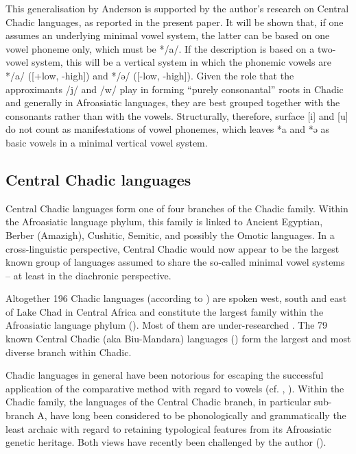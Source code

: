 \documentclass[output=paper]{langscibook}
\begin{document}
This generalisation by Anderson is supported by the author’s research on Central Chadic languages, as reported in the present paper. It will be shown that, if one assumes an underlying minimal vowel system, the latter can be based on one vowel phoneme only, which must be */a/. If the description is based on a two-vowel system, this will be a vertical system in which the phonemic vowels are \mbox{*/a/} ([+low, -high]) and \mbox{*/ə/} ([-low, -high]). Given the role that the approximants \mbox{/j/} and \mbox{/w/} play in forming ``purely consonantal'' roots in Chadic and generally in Afroasiatic languages, they are best grouped together with the consonants rather than with the vowels. Structurally, therefore, surface \mbox{[i]} and \mbox{[u]} do not count as manifestations of vowel phonemes, which leaves \mbox{*a} and \mbox{*ə} as basic vowels in a minimal vertical vowel system.

\subsection{Central Chadic languages}
\label{sec:Wolff:1.3}
Central Chadic languages form one of four branches of the Chadic family. Within the Afroasiatic language phylum, this family is linked to Ancient Egyptian, Berber (Amazigh), Cushitic, Semitic, and possibly the Omotic languages. In a cross\hyp linguistic perspective, Central Chadic would now appear to be the largest known group of languages assumed to share the so-called minimal vowel systems – at least in the diachronic perspective. 

Altogether 196 Chadic languages (according to \citealt{ethnologue24}) are spoken west, south and east of Lake Chad in Central Africa and constitute the largest family within the Afroasiatic language phylum (\citealt{Greenberg1963, Newman1980}). Most of them are under-researched \citep{Newman2006, FrajzyngierShay2012, MeyerWolff2019, WolffPress}. The 79 known Central Chadic (aka Biu-Mandara) languages (\citealt{ethnologue24}) form the largest and most diverse branch within Chadic. 

Chadic languages in general have been notorious for escaping the successful application of the comparative method with regard to vowels (cf. \citealt{Newman1977, JungraithmayrShimizu1981, Stolbova2016}, \citealt{Wolff2017, Wolff2022a}). Within the Chadic family, the languages of the Central Chadic branch, in particular sub-branch A, have long been considered to be phonologically and grammatically the least archaic with regard to retaining typological features from its Afroasiatic genetic heritage. Both views have recently been challenged by the author (\citealt{Wolff2009, Wolff2011, Wolff2017, Wolff2022a, Wolffinpressb}).
\end{document}
